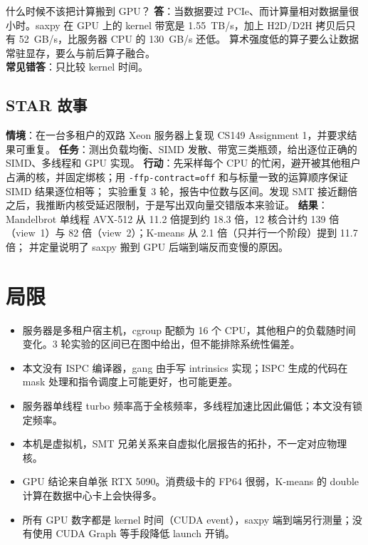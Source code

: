 \documentclass[11pt,a4paper]{ctexart}
\begin{document}
\begin{iqbox}{什么时候不该把计算搬到 GPU？}
\textbf{答}：当数据要过 PCIe、而计算量相对数据量很小时。saxpy 在 GPU 上的 kernel 带宽是 1.55~TB/s，加上 H2D/D2H 拷贝后只有 52~GB/s，比服务器 CPU 的 130~GB/s 还低。
算术强度低的算子要么让数据常驻显存，要么与前后算子融合。\\
\textbf{常见错答}：只比较 kernel 时间。
\end{iqbox}

\subsection{STAR 故事}

\textbf{情境}：在一台多租户的双路 Xeon 服务器上复现 CS149 Assignment 1，并要求结果可重复。
\textbf{任务}：测出负载均衡、SIMD 发散、带宽三类瓶颈，给出逐位正确的 SIMD、多线程和 GPU 实现。
\textbf{行动}：先采样每个 CPU 的忙闲，避开被其他租户占满的核，并固定绑核；用 \texttt{-ffp-contract=off} 和与标量一致的运算顺序保证 SIMD 结果逐位相等；
实验重复 3 轮，报告中位数与区间。发现 SMT 接近翻倍之后，我推断内核受延迟限制，于是写出双向量交错版本来验证。
\textbf{结果}：Mandelbrot 单线程 AVX-512 从 11.2 倍提到约 18.3 倍，12 核合计约 139 倍（view~1）与 82 倍（view~2）；K-means 从 2.1 倍（只并行一个阶段）提到 11.7 倍；
并定量说明了 saxpy 搬到 GPU 后端到端反而变慢的原因。

\section{局限}

\begin{caveatbox}
\begin{itemize}
\item 服务器是多租户宿主机，cgroup 配额为 16 个 CPU，其他租户的负载随时间变化。3 轮实验的区间已在图中给出，但不能排除系统性偏差。
\item 本文没有 ISPC 编译器，gang 由手写 intrinsics 实现；ISPC 生成的代码在 mask 处理和指令调度上可能更好，也可能更差。
\item 服务器单线程 turbo 频率高于全核频率，多线程加速比因此偏低；本文没有锁定频率。
\item 本机是虚拟机，SMT 兄弟关系来自虚拟化层报告的拓扑，不一定对应物理核。
\item GPU 结论来自单张 RTX 5090。消费级卡的 FP64 很弱，K-means 的 double 计算在数据中心卡上会快得多。
\item 所有 GPU 数字都是 kernel 时间（CUDA event），saxpy 端到端另行测量；没有使用 CUDA Graph 等手段降低 launch 开销。
\end{itemize}
\end{caveatbox}
\end{document}

